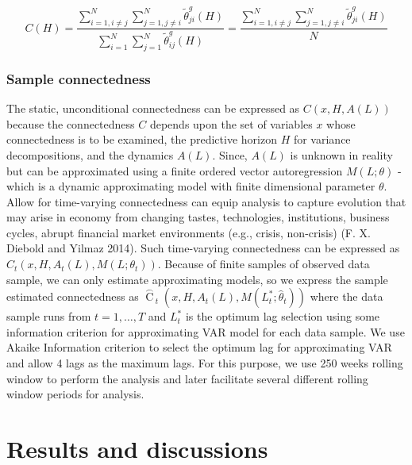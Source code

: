 \documentclass[]{elsarticle} %
\begin{document}
\[C\left( H \right)=\frac{\sum\nolimits_{i=1,i\ne j}^{N}{\sum\nolimits_{j=1,j\ne i}^{N}{\tilde{\theta }_{ji}^{g}\left( H \right)}}}{\sum\nolimits_{i=1}^{N}{\sum\nolimits_{j=1}^{N}{\tilde{\theta }_{ij}^{g}\left( H \right)}}}=\frac{\sum\nolimits_{i=1,i\ne j}^{N}{\sum\nolimits_{j=1,j\ne i}^{N}{\tilde{\theta }_{ji}^{g}\left( H \right)}}}{N}\]

\subsubsection{\texorpdfstring{\textbf{Sample
connectedness}}{Sample connectedness}}\label{sample-connectedness}

The static, unconditional connectedness can be expressed as
\(C\left( x,H,A\left( L \right) \right)\) because the connectedness
\(C\) depends upon the set of variables \(x\) whose connectedness is to
be examined, the predictive horizon \(H\) for variance decompositions,
and the dynamics \(A\left( L \right)\). Since, \(A\left( L \right)\) is
unknown in reality but can be approximated using a finite ordered vector
autoregression \(M\left( L;\theta \right)\) -which is a dynamic
approximating model with finite dimensional parameter \(\theta\). Allow
for time-varying connectedness can equip analysis to capture evolution
that may arise in economy from changing tastes, technologies,
institutions, business cycles, abrupt financial market environments
(e.g., crisis, non-crisis) (F. X. Diebold and Yilmaz 2014). Such
time-varying connectedness can be expressed as
\({{C}_{t}}\left( x,H,{{A}_{t}}\left( L \right),M\left( L;{{\theta }_{t}} \right) \right)\).
Because of finite samples of observed data sample, we can only estimate
approximating models, so we express the sample estimated connectedness
as
\({{\overset{\frown }{\mathop{C}}\,}_{t}}\left( x,H,{{A}_{t}}\left( L \right),M\left( L_{t}^{*};{{{\hat{\theta }}}_{t}} \right) \right)\)
where the data sample runs from \(t=1,\ldots ,T\) and \(L_{t}^{*}\) is
the optimum lag selection using some information criterion for
approximating VAR model for each data sample. We use Akaike Information
criterion to select the optimum lag for approximating VAR and allow 4
lags as the maximum lags. For this purpose, we use 250 weeks rolling
window to perform the analysis and later facilitate several different
rolling window periods for analysis.

\section{Results and discussions}\label{results-and-discussions}
\end{document}
